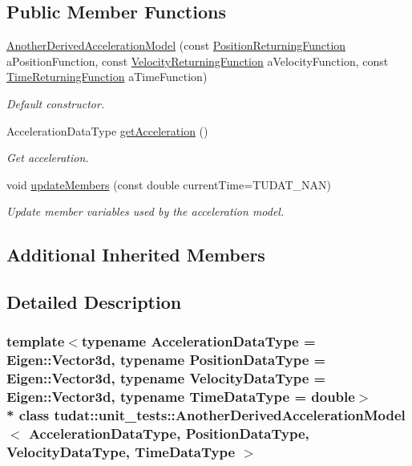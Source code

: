 \subsection*{Public Member Functions}
\begin{DoxyCompactItemize}
\item 
\hyperlink{classtudat_1_1unit__tests_1_1AnotherDerivedAccelerationModel_aaacbc7b46b24df7e6313f2a041cd6cac}{Another\+Derived\+Acceleration\+Model} (const \hyperlink{classtudat_1_1unit__tests_1_1AnotherDerivedAccelerationModel_afc6c0f446142eb265d5306b9d50e82d6}{Position\+Returning\+Function} a\+Position\+Function, const \hyperlink{classtudat_1_1unit__tests_1_1AnotherDerivedAccelerationModel_a34ee57f48cdcac94bdf12e282de14756}{Velocity\+Returning\+Function} a\+Velocity\+Function, const \hyperlink{classtudat_1_1unit__tests_1_1AnotherDerivedAccelerationModel_a69b5e6c22cec492702d5d25fc6db8dfb}{Time\+Returning\+Function} a\+Time\+Function)
\begin{DoxyCompactList}\small\item\em Default constructor. \end{DoxyCompactList}\item 
Acceleration\+Data\+Type \hyperlink{classtudat_1_1unit__tests_1_1AnotherDerivedAccelerationModel_ab025d414ca6b01e768198e2ab1f9c9d0}{get\+Acceleration} ()
\begin{DoxyCompactList}\small\item\em Get acceleration. \end{DoxyCompactList}\item 
void \hyperlink{classtudat_1_1unit__tests_1_1AnotherDerivedAccelerationModel_add07599d1c34c2479f2271b7703297aa}{update\+Members} (const double current\+Time=T\+U\+D\+A\+T\+\_\+\+N\+AN)
\begin{DoxyCompactList}\small\item\em Update member variables used by the acceleration model. \end{DoxyCompactList}\end{DoxyCompactItemize}
\subsection*{Additional Inherited Members}


\subsection{Detailed Description}
\subsubsection*{template$<$typename Acceleration\+Data\+Type = Eigen\+::\+Vector3d, typename Position\+Data\+Type = Eigen\+::\+Vector3d, typename Velocity\+Data\+Type = Eigen\+::\+Vector3d, typename Time\+Data\+Type = double$>$\\*
class tudat\+::unit\+\_\+tests\+::\+Another\+Derived\+Acceleration\+Model$<$ Acceleration\+Data\+Type, Position\+Data\+Type, Velocity\+Data\+Type, Time\+Data\+Type $>$}


